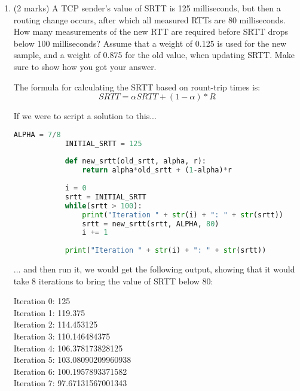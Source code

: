 \documentclass[10pt]{amsart}
\begin{document}
\begin{enumerate}
    \item (2 marks) A TCP sender’s value of SRTT is 125 milliseconds, but then a
        routing change occurs, after which all measured RTTs are 80
        milliseconds. How many measurements of the new RTT are required before
        SRTT drops below 100 milliseconds? Assume that a weight of 0.125 is used
        for the new sample, and a weight of 0.875 for the old value, when
        updating SRTT. Make sure to show how you got your answer.

        The formula for calculating the SRTT based on rount-trip times is:
        \[ SRTT = \alpha SRTT + (1-\alpha) * R \]

        If we were to script a solution to this...

        \begin{lstlisting}[language=python]
            ALPHA = 7/8
            INITIAL_SRTT = 125
            
            def new_srtt(old_srtt, alpha, r):
                return alpha*old_srtt + (1-alpha)*r
            
            i = 0
            srtt = INITIAL_SRTT
            while(srtt > 100):
                print("Iteration " + str(i) + ": " + str(srtt))
                srtt = new_srtt(srtt, ALPHA, 80)
                i += 1
            
            print("Iteration " + str(i) + ": " + str(srtt))
        \end{lstlisting}

        ... and then run it, we would get the following output, showing that it
        would take 8 iterations to bring the value of SRTT below 80:

        Iteration 0: 125\\
        Iteration 1: 119.375\\
        Iteration 2: 114.453125\\
        Iteration 3: 110.146484375\\
        Iteration 4: 106.378173828125\\
        Iteration 5: 103.08090209960938\\
        Iteration 6: 100.1957893371582\\
        Iteration 7: 97.67131567001343\\


\end{enumerate}
\end{document}

